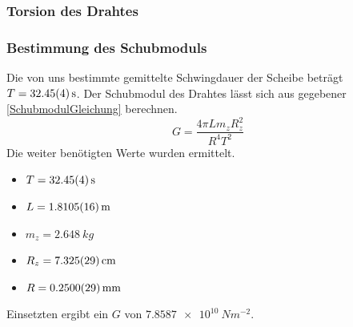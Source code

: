 \documentclass[
	a4paper,
	12pt,
	pagesize,
	ngerman
]{scrartcl}
\begin{document}
	\subsubsection{Torsion des Drahtes}
	\subsubsection*{Bestimmung des Schubmoduls}
	Die von uns bestimmte gemittelte Schwingdauer der Scheibe beträgt $T=\SI{32,45 \pm 0,04}{s}$. Der Schubmodul des Drahtes lässt sich aus gegebener \cref{SchubmodulGleichung} berechnen.
	\begin{equation}
		\label{SchubmodulGleichung}
		G = \frac{4\pi Lm_zR_z^2}{R^4T^2}
	\end{equation}
	Die weiter benötigten Werte wurden ermittelt. 
	\begin{itemize}
		\item $T=\SI{32,45 \pm 0,04}{s}$
		\item $L = \SI{1,8105 \pm 0,0016 }{m}$
		\item $m_z = \SI{2,648}{kg}$
		\item $R_z = \SI{7,325 \pm 0,029}{cm}$
		\item $R = \SI{0,25 \pm 0,0029}{mm}$
	\end{itemize}
	Einsetzten ergibt ein $G$ von $\SI{7,8587e10}{Nm^{-2}}$.
\end{document}
